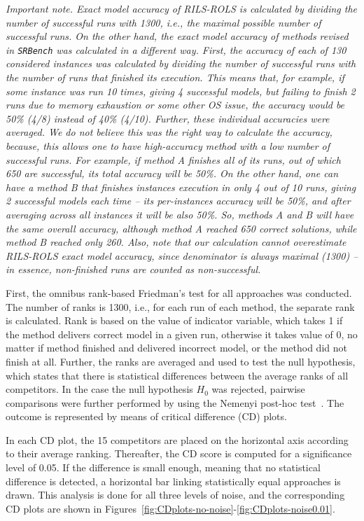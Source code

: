 \documentclass{bmcart}
\begin{document}
\emph{Important note. Exact model accuracy of \textsc{RILS-ROLS} is calculated by dividing the number of successful runs with 1300, i.e., the maximal possible number of successful runs. 
On the other hand, the exact model accuracy of methods revised in \texttt{SRBench} was calculated in a different way. First, the accuracy of each of 130 considered instances was calculated by dividing the number of successful runs with the number of runs that finished its execution. This means that, for example, if some instance was run 10 times, giving 4 successful models, but failing to finish 2 runs due to memory exhaustion or some other OS issue, the accuracy would be 50\% (4/8) instead of 40\% (4/10). Further, these individual accuracies were averaged. 
We do not believe this was the right way to calculate the accuracy, because, this allows one to have high-accuracy method with a low number of successful runs. For example, if method A finishes all of its runs, out of which 650 are successful, its total accuracy will be 50\%. On the other hand, one can have a method B that finishes instances execution in only 4 out of 10 runs, giving 2 successful models each time -- its per-instances accuracy will be 50\%, and after averaging across all instances it will be also 50\%. So, methods A and B will have the same overall accuracy, although method A reached 650 correct solutions, while method B reached only 260. Also, note that our calculation cannot overestimate \textsc{RILS-ROLS} exact model accuracy, since denominator is always maximal (1300) -- in essence, non-finished runs are counted as non-successful.} 

First, the omnibus rank-based Friedman’s test for all approaches was conducted. 
The number of ranks is 1300, i.e., for each run of each method, the separate rank is calculated. Rank is based on the value of indicator variable, which takes 1 if the method delivers correct model in a given run, otherwise it takes value of 0, no matter if method finished and delivered incorrect model, or the method did not finish at all.   Further, the ranks are averaged and used to test the null hypothesis, which states that there is   statistical differences between the average ranks of all competitors. 
In the case the null hypothesis $H_0$ was rejected, pairwise comparisons were further performed by using the Nemenyi post-hoc test~\cite{pohlert2014pairwise}. The outcome is represented by means of critical difference (CD) plots. 
 
In each CD plot, the 15 competitors are placed on the horizontal axis according to their average ranking. Thereafter, the CD score is computed for a significance level of 0.05. If the difference is small enough, meaning that no statistical difference is detected, a horizontal bar linking statistically equal approaches is drawn. This analysis is done for all three levels of noise, and the corresponding CD plots are shown in Figures~\ref{fig:CDplots-no-noise}-\ref{fig:CDplots-noise0.01}. 
\end{document}
